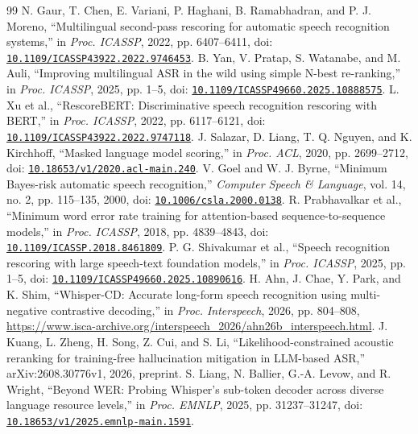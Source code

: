 \documentclass{article}
\begin{document}
\begin{thebibliography}{99}
 N. Gaur, T. Chen, E. Variani, P. Haghani, B. Ramabhadran, and P. J. Moreno, ``Multilingual second-pass rescoring for automatic speech recognition systems,'' in \emph{Proc. ICASSP}, 2022, pp. 6407--6411, doi: \href{https://doi.org/10.1109/ICASSP43922.2022.9746453}{\nolinkurl{10.1109/ICASSP43922.2022.9746453}}.
 B. Yan, V. Pratap, S. Watanabe, and M. Auli, ``Improving multilingual ASR in the wild using simple N-best re-ranking,'' in \emph{Proc. ICASSP}, 2025, pp. 1--5, doi: \href{https://doi.org/10.1109/ICASSP49660.2025.10888575}{\nolinkurl{10.1109/ICASSP49660.2025.10888575}}.
 L. Xu et al., ``RescoreBERT: Discriminative speech recognition rescoring with BERT,'' in \emph{Proc. ICASSP}, 2022, pp. 6117--6121, doi: \href{https://doi.org/10.1109/ICASSP43922.2022.9747118}{\nolinkurl{10.1109/ICASSP43922.2022.9747118}}.
 J. Salazar, D. Liang, T. Q. Nguyen, and K. Kirchhoff, ``Masked language model scoring,'' in \emph{Proc. ACL}, 2020, pp. 2699--2712, doi: \href{https://doi.org/10.18653/v1/2020.acl-main.240}{\nolinkurl{10.18653/v1/2020.acl-main.240}}.
 V. Goel and W. J. Byrne, ``Minimum Bayes-risk automatic speech recognition,'' \emph{Computer Speech \& Language}, vol. 14, no. 2, pp. 115--135, 2000, doi: \href{https://doi.org/10.1006/csla.2000.0138}{\nolinkurl{10.1006/csla.2000.0138}}.
 R. Prabhavalkar et al., ``Minimum word error rate training for attention-based sequence-to-sequence models,'' in \emph{Proc. ICASSP}, 2018, pp. 4839--4843, doi: \href{https://doi.org/10.1109/ICASSP.2018.8461809}{\nolinkurl{10.1109/ICASSP.2018.8461809}}.
 P. G. Shivakumar et al., ``Speech recognition rescoring with large speech-text foundation models,'' in \emph{Proc. ICASSP}, 2025, pp. 1--5, doi: \href{https://doi.org/10.1109/ICASSP49660.2025.10890616}{\nolinkurl{10.1109/ICASSP49660.2025.10890616}}.
 H. Ahn, J. Chae, Y. Park, and K. Shim, ``Whisper-CD: Accurate long-form speech recognition using multi-negative contrastive decoding,'' in \emph{Proc. Interspeech}, 2026, pp. 804--808, \url{https://www.isca-archive.org/interspeech_2026/ahn26b_interspeech.html}.
 J. Kuang, L. Zheng, H. Song, Z. Cui, and S. Li, ``Likelihood-constrained acoustic reranking for training-free hallucination mitigation in LLM-based ASR,'' arXiv:2608.30776v1, 2026, preprint.
 S. Liang, N. Ballier, G.-A. Levow, and R. Wright, ``Beyond WER: Probing Whisper's sub-token decoder across diverse language resource levels,'' in \emph{Proc. EMNLP}, 2025, pp. 31237--31247, doi: \href{https://doi.org/10.18653/v1/2025.emnlp-main.1591}{\nolinkurl{10.18653/v1/2025.emnlp-main.1591}}.

\end{thebibliography}
\end{document}
